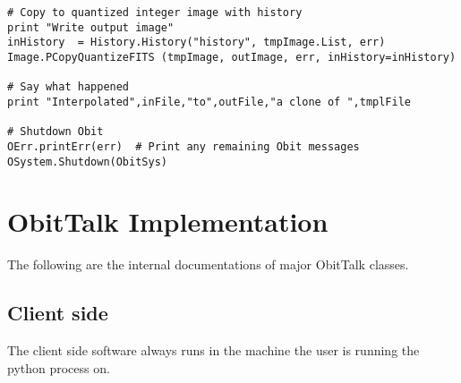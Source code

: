 \documentclass[11pt]{report}
\begin{document}
\begin{verbatim}
# Copy to quantized integer image with history
print "Write output image"
inHistory  = History.History("history", tmpImage.List, err)
Image.PCopyQuantizeFITS (tmpImage, outImage, err, inHistory=inHistory)

# Say what happened
print "Interpolated",inFile,"to",outFile,"a clone of ",tmplFile

# Shutdown Obit
OErr.printErr(err)  # Print any remaining Obit messages
OSystem.Shutdown(ObitSys)
\end{verbatim}

\section{ObitTalk Implementation}
The following are the internal documentations of major ObitTalk classes.
\subsection{Client side}
The client side software always runs in the machine the user is
running the python process on.
\end{document}
